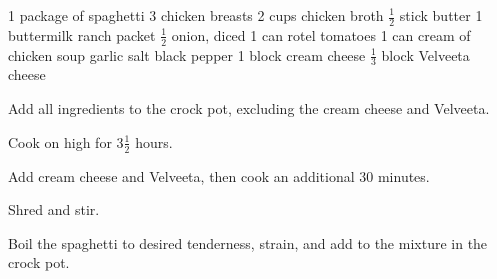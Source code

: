 \dishtype{}
\begin{ingreds}
    1 package of spaghetti
    3 chicken breasts
    2 cups chicken broth
    $\frac{1}{2}$ stick butter 
    1 buttermilk ranch packet
    $\frac{1}{2}$ onion, diced
    1 can rotel tomatoes 
    1 can cream of chicken soup
    garlic salt
    black pepper
    1 block cream cheese
    $\frac{1}{3}$ block Velveeta\textsuperscript{\textregistered} cheese
\end{ingreds}
\begin{method}
    Add all ingredients to the crock pot, excluding the cream cheese and Velveeta\textsuperscript{\textregistered}.\par
    Cook on high for 3$\frac{1}{2}$ hours.\par
    Add cream cheese and Velveeta\textsuperscript{\textregistered}, then cook an additional 30 minutes.\par
    Shred and stir.\par
    Boil the spaghetti to desired tenderness, strain, and add to the mixture in the crock pot. 
\end{method}